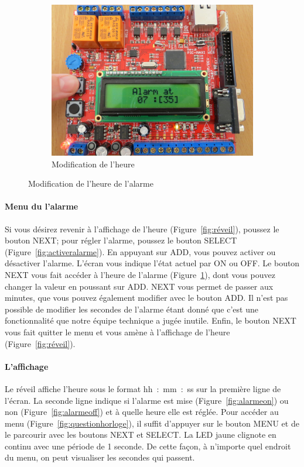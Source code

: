 \documentclass[12pt,a4paper]{article}
\begin{document}
\begin{figure}[!h]
\begin{subfigure}[b]{0.4\textwidth}
                \includegraphics[width=\textwidth]{photos/IMG_2157.JPG}
                \caption{Modification de l'heure}
                \label{fig:modificationalarme}
        \end{subfigure}
        \caption{Modification de l'heure de l'alarme}\label{fig:changeralarme}
\end{figure}

\paragraph{Menu du l'alarme} Si vous désirez revenir à l'affichage de l'heure (Figure~\ref{fig:réveil}), poussez le bouton NEXT; pour régler l'alarme, poussez le bouton SELECT (Figure~\ref{fig:activeralarme}). En appuyant sur ADD, vous pouvez activer ou désactiver l'alarme. L'écran vous indique l'état actuel par ON ou OFF. Le bouton NEXT vous fait accéder à l'heure de l'alarme (Figure~\ref{fig:modificationalarme}), dont vous pouvez changer la valeur en poussant sur ADD. NEXT vous permet de passer aux minutes, que vous pouvez également modifier avec le bouton ADD. Il n'est pas possible de modifier les secondes de l'alarme étant donné que c'est une fonctionnalité que notre équipe technique a jugée inutile. Enfin, le bouton NEXT vous fait quitter le menu et vous amène à l'affichage de l'heure (Figure~\ref{fig:réveil}).

\paragraph{L'affichage}
Le réveil affiche l'heure sous le format hh~:~mm~:~ss sur la première ligne de l'écran. La seconde ligne indique si l'alarme est mise (Figure~\ref{fig:alarmeon}) ou non (Figure~\ref{fig:alarmeoff}) et à quelle heure elle est réglée. Pour accéder au menu (Figure~\ref{fig:questionhorloge}), il suffit d'appuyer sur le bouton MENU et de le parcourir avec les boutons NEXT et SELECT. La LED jaune clignote en continu avec une période de 1 seconde. De cette façon, à n'importe quel endroit du menu, on peut visualiser les secondes qui passent.
\end{document}
